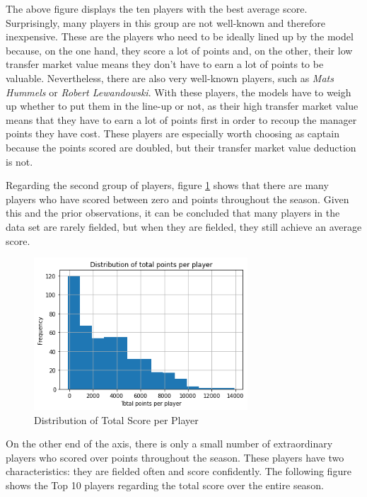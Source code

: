 The above figure displays the ten players with the best average score. Surprisingly, many players in this group are not well-known and therefore inexpensive. These are the players who need to be ideally lined up by the model because, on the one hand, they score a lot of points and, on the other, their low transfer market value means they don't have to earn a lot of points to be valuable. Nevertheless, there are also very well-known players, such as \emph{Mats Hummels} or \emph{Robert Lewandowski}. With these players, the models have to weigh up whether to put them in the line-up or not, as their high transfer market value means that they have to earn a lot of points first in order to recoup the manager points they have cost. These players are especially worth choosing as captain because the points scored are doubled, but their transfer market value deduction is not.

Regarding the second group of players, figure \ref{fig:distribution_of_total_score_per_player} shows that there are many players who have scored between zero and  points throughout the season. Given this and the prior observations, it can be concluded that many players in the data set are rarely fielded, but when they are fielded, they still achieve an average score.

\begin{figure}[H]
    \centering
    \includegraphics[width=8cm]{chapter/4_implementation/section/2_data/section/figures/distribution_of_total_score_per_player.png}
    \captionsetup{justification=centering}
    \caption{Distribution of Total Score per Player}
    \label{fig:distribution_of_total_score_per_player}
\end{figure}

On the other end of the axis, there is only a small number of extraordinary players who scored over  points throughout the season. These players have two characteristics: they are fielded often and score confidently. The following figure shows the Top 10 players regarding the total score over the entire season. 

